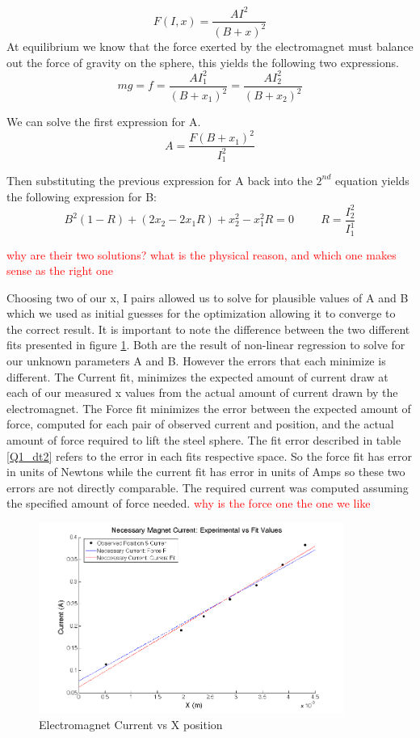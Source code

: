 \documentclass{article}
\newcommand{\xxx}[1]{\textcolor{red}{#1}}
\theoremstyle{plain}
\theoremstyle{definition}
\theoremstyle{remark}
\begin{document}
$$ F(I,x) = \frac{A I^2}{(B+x)^2} $$
At equilibrium we know that the force exerted by the electromagnet must balance out the force of gravity on the sphere, this yields the following two expressions.
$$ mg = f = \frac{A I_{1}^2}{(B+x_{1})^2}  = \frac{A I_{2}^2}{(B+x_{2})^2} $$ 

We can solve the first expression for A.
$$ A = \frac{F (B + x_{1})^2}{I_{1}^2}$$

Then substituting the previous expression for A back into the $2^{nd}$ equation yields the following expression for B:
$$ B^2(1-R) + (2x_2-2x_1R)+x_2^2-x_1^2R = 0 \hspace{1cm} R = \frac{I_2^2}{I_1^1} $$

\xxx{why are their two solutions? what is the physical reason, and which one makes sense as the right one}

Choosing two of our x, I pairs allowed us to solve for plausible values of A and B which we used as initial guesses for the optimization allowing it to converge to the correct result.  It is important to note the difference between the two different fits presented in figure \ref{Q1_d3}.  Both are the result of non-linear regression to solve for our unknown parameters A and B.  However the errors that each minimize is different.  The Current fit, minimizes the expected amount of current draw at each of our measured x values from the actual amount of current drawn by the electromagnet.  The Force fit minimizes the error between the expected amount of force, computed for each pair of observed current and position, and the actual amount of force required to lift the steel sphere.  The fit error described in table \ref{Q1_dt2} refers to the error in each fits respective space.  So the force fit has error in units of Newtons while the current fit has error in units of Amps so these two errors are not directly comparable.  The required current was computed assuming the specified amount of force needed.
\xxx{why is the force one the one we like}

\begin{figure}
\begin{center}
\includegraphics[width = 10cm]{magnetDataFits.png}
\end{center}
\label{Q1_d3}
\caption{Electromagnet Current vs X position}
\end{figure}
\end{document}
